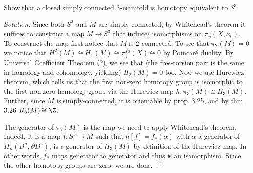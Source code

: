 \iffalse\begin{remark}
	About Riemann surfaces
	
		\[\begin{tikzcd}
		\widetilde{U\backslash x}\arrow[d,swap,"p"]\arrow[r,"\tilde{f}"]&\widetilde{W\backslash y}\arrow[d,"q"]\\
		U\backslash x\arrow[r,"f",swap]&W\backslash y
	\end{tikzcd}\qquad\qquad
	\begin{tikzcd}
		\pi_i(\tilde{X})\arrow[r,"\tilde{f}_*"]\arrow[d,swap,"p_*"]\arrow[d,"\cong"]&\pi_i(\tilde{Y})\arrow[d,"q_*"]\arrow[d,swap,"\cong"]\\
		\pi_i(X)\arrow[r,"f_*",swap]\arrow[r,"\cong"]&\pi_i(Y)
	\end{tikzcd}\qquad i\geq2\]
\end{remark}\fi

\begin{exercise}[4.2.15]
	Show that a closed simply connected 3-manifold is homotopy equivalent to $S^3$.
\end{exercise}
\begin{proof}[Solution]
	Since both $S^3$  and $M$ are simply connected, by Whitehead's theorem it suffices to construct a map $M\to S^3$ that induces isomorphisms on $\pi_n(X,x_0)$. To construct the map first notice that $M$ is 2-connected. To see that $\pi_2(M)=0$ we notice that $H^2(M)\cong H_1(M)\cong \pi_1^{\operatorname{ab}}(X)\cong 0$ by Poincar\'e duality. By Universal Coefficient Theorem {\color{magenta}(?)}, we see that {\color{magenta}(the free-torsion part is the same in homology and cohomology, yielding)} $H_2(M)=0$ too. Now we use Hurewicz theorem, which tells us that the first non-zero homotopy group is isomorphic to the first non-zero homology group via the Hurewicz map $h:\pi_3(M)\cong H_3(M)$. Further, since $M$  is simply-connected, it is orientable by prop. 3.25, and by thm 3.26 $H_3(M)\cong \Z$.

	The generator of $\pi_3(M)$ is the map we need to apply Whitehead's theorem. Indeed, it is a map $f:S^3\to M$ such that $h[f]=f_*(\alpha)$ with $\alpha$ a generator of $H_n(D^n,\partial D^n)$, is a generator of $H_3(M)$ by definition of the Hurewicz map. In other words, $f_*$ maps generator to generator and thus is an isomorphism. Since the other homotopy groups are zero, we are done.
\end{proof}

